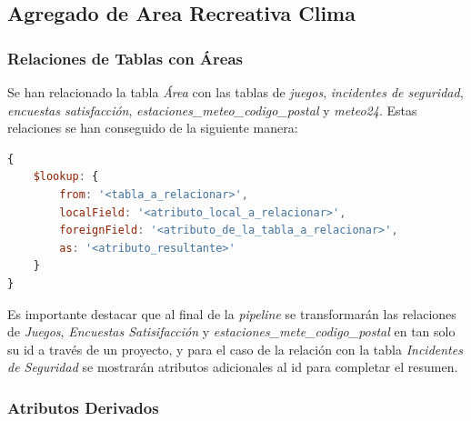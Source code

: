 \documentclass[]{article}
\begin{document}
\subsection{Agregado de Area Recreativa Clima}
\label{subsec:agregado_area}

\subsubsection{Relaciones de Tablas con Áreas}
\label{subsubsec:relaciones_area}

Se han relacionado la tabla \textit{Área} con las tablas de \textit{juegos}, \textit{incidentes de seguridad}, \textit{encuestas satisfacción}, \textit{estaciones\_meteo\_codigo\_postal} y \textit{meteo24}.
Estas relaciones se han conseguido de la siguiente manera:
\begin{lstlisting}[language=JavaScript, caption=Operadores para relacionar tablas en mongodb]
{
    $lookup: {
        from: '<tabla_a_relacionar>',
        localField: '<atributo_local_a_relacionar>',
        foreignField: '<atributo_de_la_tabla_a_relacionar>',
        as: '<atributo_resultante>'
    }
}
\end{lstlisting}

Es importante destacar que al final de la \textit{pipeline} se transformarán las relaciones de \textit{Juegos}, \textit{Encuestas Satisifacción} y \textit{estaciones\_mete\_codigo\_postal} en tan solo su id a través de un proyecto, y para el caso de la relación con la tabla \textit{Incidentes de Seguridad} se mostrarán atributos adicionales al id para completar el resumen.
\subsubsection{Atributos Derivados}
\label{subsubsec:derivados_area}
\end{document}

